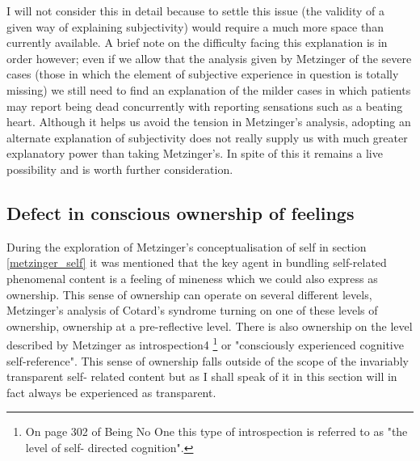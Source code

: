 I will not consider this in detail because to settle this issue (the validity of a given way of explaining subjectivity) would require a much more space than currently available. A brief note on the difficulty facing this explanation is in order however; even if we allow that the analysis given by Metzinger of the severe cases (those in which the element of subjective experience in question is totally missing) we still need to find an explanation of the milder cases in which patients may report being dead concurrently with reporting sensations such as a beating heart. Although it helps us avoid the tension in Metzinger's analysis, adopting an alternate explanation of subjectivity does not really supply us with much greater explanatory power than taking Metzinger's. In spite of this it remains a live possibility and is worth further consideration.

\subsection{Defect in conscious ownership of feelings}
\label{psych_alternatives_defect}

During the exploration of Metzinger's conceptualisation of self in section \ref{metzinger_self} it was mentioned that the key agent in bundling self-related phenomenal content is a feeling of mineness which we could also express as ownership. This sense of ownership can operate on several different levels, Metzinger's analysis of Cotard's syndrome turning on one of these levels of ownership, ownership at a pre-reflective level. There is also ownership on the level described by Metzinger as introspection4 \cite[pp. 36, 302]{metzinger2003}\footnote{On page 302 of Being No One this type of introspection is referred to as "the level of self- directed cognition".} or "consciously experienced cognitive self-reference". This sense of ownership falls outside of the scope of the invariably transparent self- related content but as I shall speak of it in this section will in fact always be experienced as transparent.

